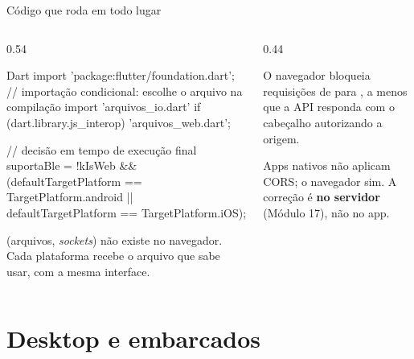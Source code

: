 \documentclass[aspectratio=169,10pt]{beamer}
\begin{document}
\begin{frame}[fragile]{Código que roda em todo lugar}
  \begin{columns}[T]
    \begin{column}{0.54\textwidth}
\begin{codigo}[title=Diferenças de plataforma]{Dart}
import 'package:flutter/foundation.dart';
// importação condicional: escolhe o arquivo na compilação
import 'arquivos_io.dart'
    if (dart.library.js_interop) 'arquivos_web.dart';

// decisão em tempo de execução
final suportaBle = !kIsWeb &&
    (defaultTargetPlatform == TargetPlatform.android ||
     defaultTargetPlatform == TargetPlatform.iOS);
\end{codigo}
      \begin{conceito}
         (arquivos, \emph{sockets}) não existe no navegador. Cada plataforma recebe o arquivo que sabe usar, com a mesma interface.
      \end{conceito}
    \end{column}
    \begin{column}{0.44\textwidth}
      \begin{definicao}
        O navegador bloqueia requisições de  para , a menos que a API responda com o cabeçalho  autorizando a origem.
      \end{definicao}
      \begin{erro}
        Apps nativos não aplicam CORS; o navegador sim. A correção é \textbf{no servidor} (Módulo 17), não no app.
      \end{erro}
    \end{column}
  \end{columns}
\end{frame}

\section{Desktop e embarcados}
\end{document}
